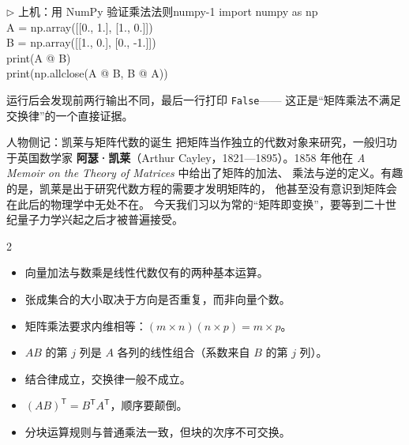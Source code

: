 \documentclass[11pt,a4paper,openany]{ctexbook}
\begin{document}
\begin{remk}{$\triangleright$ 上机：用 NumPy 验证乘法法则}{numpy-1}
{\small\ttfamily
import numpy as np\\
A = np.array([[0., 1.], [1., 0.]])\\
B = np.array([[1., 0.], [0., -1.]])\\
print(A @ B)\\
print(np.allclose(A @ B, B @ A))}
\par\smallskip
\noindent 运行后会发现前两行输出不同，最后一行打印 \texttt{False}——
这正是“矩阵乘法不满足交换律”的一个直接证据。
\end{remk}

\begin{sidebar}{人物侧记：凯莱与矩阵代数的诞生}
把矩阵当作独立的代数对象来研究，一般归功于英国数学家
\textbf{阿瑟·凯莱}（Arthur Cayley，1821—1895）。1858 年他在
\emph{A Memoir on the Theory of Matrices} 中给出了矩阵的加法、
乘法与逆的定义。有趣的是，凯莱是出于研究代数方程的需要才发明矩阵的，
他甚至没有意识到矩阵会在此后的物理学中无处不在。
今天我们习以为常的“矩阵即变换”，要等到二十世纪量子力学兴起之后才被普遍接受。
\end{sidebar}

\begin{chapkeys}
\small
\begin{multicols}{2}
\begin{itemize}[leftmargin=1.5em, itemsep=2pt]
\item 向量加法与数乘是线性代数仅有的两种基本运算。
\item 张成集合的大小取决于方向是否重复，而非向量个数。
\item 矩阵乘法要求内维相等：$(m\times n)(n\times p)=m\times p$。
\item $AB$ 的第 $j$ 列是 $A$ 各列的线性组合（系数来自 $B$ 的第 $j$ 列）。
\item 结合律成立，交换律一般不成立。
\item $(AB)^{\mathsf T}=B^{\mathsf T}A^{\mathsf T}$，顺序要颠倒。
\item 分块运算规则与普通乘法一致，但块的次序不可交换。
\end{itemize}
\end{multicols}
\end{chapkeys}
\end{document}
